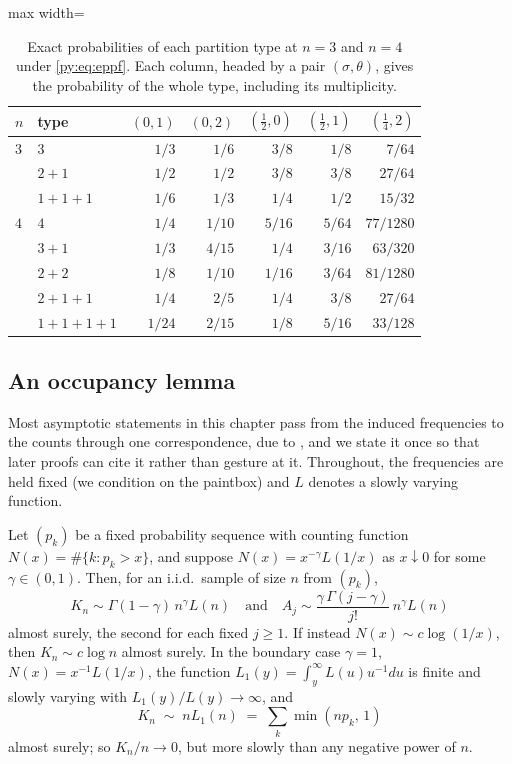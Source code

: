 \begin{table}[t]
\centering
\caption{Exact probabilities of each partition type at $n = 3$ and $n = 4$ under
\eqref{py:eq:eppf}. Each column, headed by a pair $(\sigma,\theta)$, gives the probability of the whole type,
including its multiplicity.}
\label{py:tab:eppf}
\small
\begin{adjustbox}{max width=\textwidth}
\begin{tabular}{llrrrrr}
\toprule
$n$ & type & $(0,1)$ & $(0,2)$ & $(\tfrac12,0)$ & $(\tfrac12,1)$ & $(\tfrac14,2)$\\
\midrule
$3$ & $3$     & $1/3$ & $1/6$ & $3/8$ & $1/8$ & $7/64$\\
    & $2{+}1$ & $1/2$ & $1/2$ & $3/8$ & $3/8$ & $27/64$\\
    & $1{+}1{+}1$ & $1/6$ & $1/3$ & $1/4$ & $1/2$ & $15/32$\\
\midrule
$4$ & $4$     & $1/4$ & $1/10$ & $5/16$ & $5/64$ & $77/1280$\\
    & $3{+}1$ & $1/3$ & $4/15$ & $1/4$ & $3/16$ & $63/320$\\
    & $2{+}2$ & $1/8$ & $1/10$ & $1/16$ & $3/64$ & $81/1280$\\
    & $2{+}1{+}1$ & $1/4$ & $2/5$ & $1/4$ & $3/8$ & $27/64$\\
    & $1{+}1{+}1{+}1$ & $1/24$ & $2/15$ & $1/8$ & $5/16$ & $33/128$\\
\bottomrule
\end{tabular}
\end{adjustbox}
\end{table}

\subsection{An occupancy lemma}
\label{py:sec:karlin}

Most asymptotic statements in this chapter pass from the induced frequencies to the counts through
one correspondence, due to \citet{py:karlin1967}, and we state it once so that later proofs can cite
it rather than gesture at it. Throughout, the frequencies are held fixed (we condition on the
paintbox) and $L$ denotes a slowly varying function.

\begin{lemma}
\label{py:lem:karlin}
Let $(p_k)$ be a fixed probability sequence with counting function $N(x) = \#\{k : p_k > x\}$,
and suppose $N(x) = x^{-\gamma}L(1/x)$ as $x \downarrow 0$ for some $\gamma \in (0,1)$. Then, for
an i.i.d.\ sample of size $n$ from $(p_k)$,
\[
K_n \sim \Gamma(1-\gamma)\,n^{\gamma}L(n)
\quad\text{and}\quad
A_j \sim \frac{\gamma\,\Gamma(j-\gamma)}{j!}\,n^{\gamma}L(n)
\]
almost surely, the second for each fixed $j \ge 1$.
If instead $N(x) \sim c\log(1/x)$, then $K_n \sim c\log n$ almost surely. In the boundary case $\gamma = 1$, $N(x) = x^{-1}L(1/x)$, the function $L_1(y) = \int_y^\infty L(u)u^{-1}du$ is finite and slowly varying with $L_1(y)/L(y) \to \infty$, and
\[
K_n \;\sim\; nL_1(n) \;=\; \sum_k \min(np_k,\,1)
\]
almost surely; so $K_n/n \to 0$, but more slowly than any negative power of $n$.
\end{lemma}

